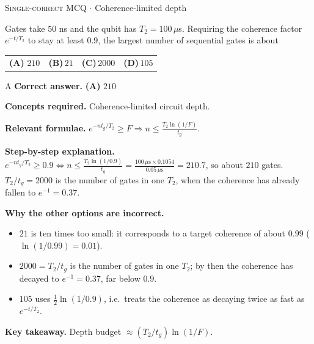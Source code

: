 \documentclass[11pt,a4paper]{article}
\newcommand{\optlabel}[1]{\textbf{(#1)}}
\newcommand{\correctlabel}[1]{\textcolor{okgreen}{\textbf{(#1)}\,\ding{51}}}
\newenvironment{qitem}[1]{\begin{list}{}{\setlength{\leftmargin}{3.3em}\setlength{\labelwidth}{3.1em}%
  \setlength{\labelsep}{0.2em}\setlength{\topsep}{3pt}\setlength{\parsep}{3pt}}\item[\textbf{Q.#1}\hfill]}{\end{list}}
\newcommand{\qsep}{\par\vspace{2pt}{\color{black!15}\hrule}\vspace{4pt}}
\newcommand{\qmeta}[2]{{\footnotesize\color{black!60}\textsc{#1} \;$\cdot$\; #2}\par}
\begin{document}
\begin{qitem}{29}
\qmeta{Single-correct MCQ}{Coherence-limited depth}
Gates take $50$ ns and the qubit has $T_2 = 100\,\mu$s. Requiring the coherence factor $e^{-t/T_2}$ to stay at least $0.9$, the largest number of
sequential gates is about
\par\smallskip\noindent\begin{tabularx}{\linewidth}{@{}*{4}{L}@{}}
\correctlabel{A}\,$210$ & \optlabel{B}\,$21$ & \optlabel{C}\,$2000$ & \optlabel{D}\,$105$
\end{tabularx}
\end{qitem}
\begin{solbox}{A}
\textbf{\color{brand}Correct answer.} \textcolor{okgreen}{\textbf{(A)}} $210$

\textbf{\color{brand}Concepts required.} Coherence-limited circuit depth.

\textbf{\color{brand}Relevant formulae.} $e^{-nt_g/T_2} \ge F \Rightarrow n \le \frac{T_2\ln(1/F)}{t_g}$.

\textbf{\color{brand}Step-by-step explanation.} $e^{-nt_g/T_2} \ge 0.9 \Leftrightarrow n \le \frac{T_2\ln(1/0.9)}{t_g} = \frac{100\,\mu\text{s}\times0.1054}{0.05\,\mu\text{s}} = 210.7$, so about $210$ gates.
$T_2/t_g = 2000$ is the number of gates in one $T_2$, when the coherence has already fallen to $e^{-1} = 0.37$.

\textbf{\color{brand}Why the other options are incorrect.}
\begin{itemize}[leftmargin=2.4em, itemsep=1pt, topsep=2pt]
\item[\textbf{(B)}] $21$ is ten times too small: it corresponds to a target coherence of about $0.99$ ($\ln(1/0.99) = 0.01$).
\item[\textbf{(C)}] $2000 = T_2/t_g$ is the number of gates in one $T_2$; by then the coherence has decayed to $e^{-1} = 0.37$, far below $0.9$.
\item[\textbf{(D)}] $105$ uses $\frac12\ln(1/0.9)$, i.e.\ treats the coherence as decaying twice as fast as $e^{-t/T_2}$.
\end{itemize}
\textbf{\color{brand}Key takeaway.} Depth budget $\approx (T_2/t_g)\ln(1/F)$.
\end{solbox}
\qsep
\end{document}
